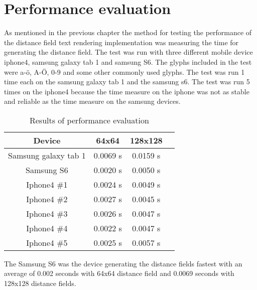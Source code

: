\section{Performance evaluation}
As mentioned in the previous chapter the method for testing the performance of the distance field text rendering implementation was measuring the time for generating the distance field. The test was run with three different mobile device iphone4, samsung galaxy tab 1 and samsung S6. The glyphs included in the test were a-ö, A-Ö, 0-9 and some other commonly used glyphs. The test was run 1 time each on the samsung galaxy tab 1 and the samsung s6. The test was run 5 times on the iphone4 because the time measure on the iphone was not as stable and reliable as the time measure on the samsung devices.

\begin{table}[H]
\caption{Results of performance evaluation}
\centering
\begin{tabular}{c c c c}
\hline
\hline %
Device & 64x64 & 128x128\\ [0.5ex] %
\hline
Samsung galaxy tab 1 & 0.0069 s & 0.0159 s \\
Samsung S6 & 0.0020 s & 0.0050 s \\
Iphone4 \#1 & 0.0024 s & 0.0049 s \\
Iphone4 \#2 & 0.0027 s & 0.0045 s \\
Iphone4 \#3 & 0.0026 s & 0.0047 s \\
Iphone4 \#4 & 0.0022 s & 0.0047 s \\
Iphone4 \#5 & 0.0025 s & 0.0057 s \\ [1ex]
\hline
\end{tabular}
\label{table:nonlin}
\end{table}
The Samsung S6 was the device generating the distance fields fastest with an average of 0.002 seconds with 64x64 distance field and 0.0069 seconds with 128x128 distance fields.
